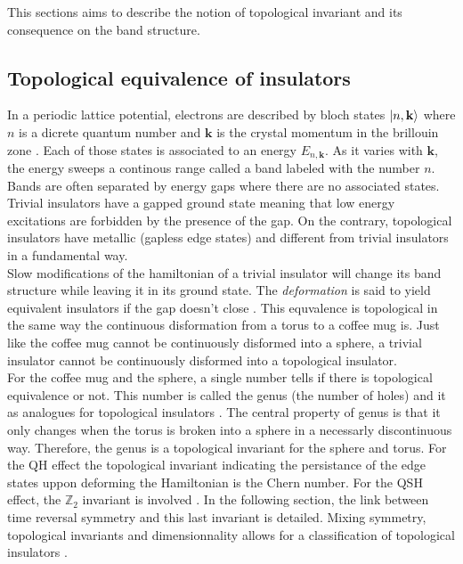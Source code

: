 This sections aims to describe the notion of topological invariant and its consequence on the band structure. 
\subsection{Topological equivalence of insulators}
In a periodic lattice potential, electrons are described by bloch states $\ket{n, \mathbf{k}}$ where $n$ is a dicrete quantum number and $\mathbf{k}$ is the crystal momentum in the brillouin zone \cite{shankar_topological_2018}. Each of those states is associated to an energy $E_{n, \mathbf{k}}$.  As it varies with $\mathbf{k}$, the energy sweeps a continous range called a band labeled with the number $n$. Bands are often separated by energy gaps where there are no associated states. Trivial insulators have a gapped ground state meaning that low energy excitations are forbidden by the presence of the gap. On the contrary, topological insulators have metallic (gapless edge states)\cite{kane_topological_2013} and different from trivial insulators in a fundamental way.\\ 

Slow modifications of the hamiltonian of a trivial insulator will change its band structure while leaving it in its ground state. The \textit{deformation} is said to yield equivalent insulators if the gap doesn't close \cite{kane_topological_2013}. This equvalence is topological in the same way the continuous disformation from a torus to a coffee mug is. Just like the coffee mug cannot be continuously disformed into a sphere, a trivial insulator cannot be continuously disformed into a topological insulator.\\

For the coffee mug and the sphere, a single number tells if there is topological equivalence or not. This number is called the genus (the number of holes) and it as analogues for topological insulators \cite{batra_physics_2020}. The central property of genus is that it only changes when the torus is broken into a sphere in a necessarly discontinuous way. Therefore, the genus is a topological invariant for the sphere and torus. For the QH effect the topological invariant indicating the persistance of the edge states uppon deforming the Hamiltonian is the Chern number. For the QSH effect, the $\mathbb{Z}_2$ invariant is involved \cite{kane_topological_2013}. In the following section, the link between time reversal symmetry and this last invariant is detailed.  Mixing symmetry, topological invariants and dimensionnality allows for a classification of topological insulators \cite{hasan_topological_2010}. 

